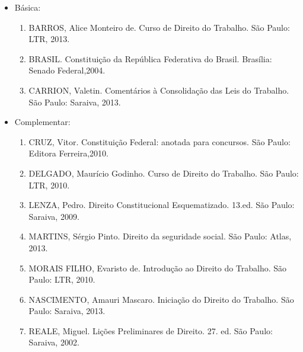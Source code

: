 \begin{itemize}

\item Básica:
    \begin{enumerate}

    \item BARROS, Alice Monteiro de. Curso de Direito do Trabalho. São Paulo: LTR, 2013.

    \item BRASIL. Constituição da República Federativa do Brasil. Brasília: Senado Federal,2004.

    \item CARRION, Valetin. Comentários à Consolidação das Leis do Trabalho. São Paulo: Saraiva, 2013.
    \end{enumerate}

\item Complementar:
    \begin{enumerate}

    \item CRUZ, Vitor. Constituição Federal: anotada para concursos. São Paulo: Editora Ferreira,2010.

    \item DELGADO, Maurício Godinho. Curso de Direito do Trabalho. São Paulo: LTR, 2010.

    \item LENZA, Pedro. Direito Constitucional Esquematizado. 13.ed. São Paulo: Saraiva, 2009.

    \item MARTINS, Sérgio Pinto. Direito da seguridade social. São Paulo: Atlas, 2013.

	\item MORAIS FILHO, Evaristo de. Introdução ao Direito do Trabalho. São Paulo: LTR, 2010.

	\item NASCIMENTO, Amauri Mascaro. Iniciação do Direito do Trabalho. São Paulo: Saraiva, 2013.

	\item REALE, Miguel. Lições Preliminares de Direito. 27. ed. São Paulo: Saraiva, 2002.

    \end{enumerate}

\end{itemize}
